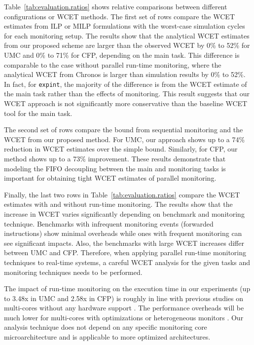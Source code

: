 Table~\ref{tab:evaluation.ratios} shows relative comparisons between
different configurations or WCET methods.
The first set of rows compare the WCET estimates from ILP or MILP formulations
with the worst-case simulation cycles for each monitoring setup. 
The results show that the analytical WCET estimates from our proposed scheme
are larger than the observed WCET by 0\% to 52\% for UMC and 0\% to 71\% for CFP, 
depending on the main task. This difference is comparable to the case without
parallel run-time monitoring, where the analytical WCET from Chronos
is larger than simulation results by 0\% to 52\%. 
In fact, for {\tt expint}, the majority of the difference is from the WCET
estimate of the main task rather than the effects of monitoring.
This result suggests that our WCET approach is not significantly more conservative than
the baseline WCET tool for the main task.

The second set of rows compare the bound from sequential monitoring and the WCET 
from our proposed method. 
For UMC, our approach shows up to a 74\% reduction in WCET estimates over the simple
bound. Similarly, for CFP, our method shows up to a 73\% improvement.
These results demonstrate that modeling the FIFO decoupling between the main and monitoring
tasks is important for obtaining tight WCET estimates of parallel
monitoring. 

Finally, the last two rows in Table~\ref{tab:evaluation.ratios} compare the WCET 
estimates with and without run-time monitoring.
The results show that the increase in WCET varies significantly depending on
benchmark and monitoring technique. Benchmarks with infrequent monitoring
events (forwarded instructions) show minimal overheads while ones with frequent
monitoring can see significant impacts.
Also, the benchmarks with large WCET increases differ between UMC and CFP.
Therefore, when applying parallel run-time monitoring techniques to real-time systems,
a careful WCET analysis for the given tasks and monitoring techniques 
needs to be performed. 

The impact of run-time monitoring on the execution time in our experiments
(up to 3.48x in UMC and 2.58x in CFP) is roughly in line with previous studies
on multi-cores without any hardware support \cite{chen08-lba, nagarajan08-dift}. 
The performance overheads will be much lower for multi-cores with optimizations 
\cite{chen08-lba} or heterogeneous monitors \cite{flexcore-micro10}. 
Our analysis technique does not depend on any specific monitoring core
microarchitecture and is applicable to more optimized architectures.

